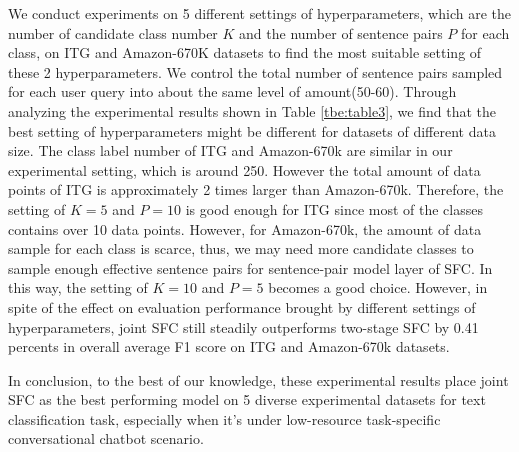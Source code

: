 We  conduct  experiments on 5 different settings of hyperparameters, which are
the  number of candidate class number $K$ and the number of sentence pairs $P$
for  each  class,  on  ITG  and Amazon-670K datasets to find the most suitable
setting  of  these  2 hyperparameters. We control the total number of sentence
pairs  sampled for each user query into about the same level of amount(50-60).
Through  analyzing the experimental results shown in Table \ref{tbe:table3}, we
find  that the best setting of hyperparameters might be different for datasets
of  different  data  size.  The  class label number of ITG and Amazon-670k are
similar  in  our  experimental setting, which is around 250. However the total
amount of data points of ITG is approximately 2 times larger than Amazon-670k.
Therefore,  the  setting of $K=5$ and $P=10$ is good enough for ITG since most
of  the  classes  contains  over 10 data points. However, for Amazon-670k, the
amount  of  data  sample  for  each  class  is  scarce, thus, we may need more
candidate  classes to sample enough effective sentence pairs for sentence-pair
model  layer  of  SFC.  In this way, the setting of $K=10$ and $P=5$ becomes a
good choice. However, in spite of the effect on evaluation performance brought
by different settings of hyperparameters, joint SFC still steadily outperforms
two-stage  SFC  by  0.41  percents  in  overall  average  F1 score  on  ITG and
Amazon-670k datasets.

In  conclusion, to the best of our knowledge, these experimental results place
joint  SFC as the best performing model on 5 diverse experimental datasets for
text   classification   task,   especially   when   it's   under  low-resource
task-specific conversational chatbot scenario.

